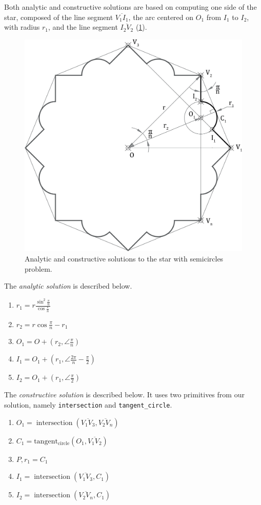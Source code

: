 Both analytic and constructive solutions are based on computing one side of the
star, composed of the line segment $\overline{V_1 I_1}$, the arc centered on
$O_1$ from $I_1$ to $I_2$, with radius $r_1$, and the line segment 
$\overline{I_2 V_2}$ (\cref{fig:eval.studies.star.sol}).

\begin{figure}[htb]
  \includegraphics[width=.7\linewidth]{fig/star-solution}
  \caption{\label{fig:eval.studies.star.sol}
    Analytic and constructive solutions to the star with semicircles problem.}%
\end{figure}

The \textit{analytic solution} is described below.

\begin{enumerate}
  \item $r_1 = r\frac{\sin^2\frac{\pi}{n}}{\cos\frac{\pi}{n}}$
  \item $r_2 = r\cos\frac{\pi}{n} - r_1$
  \item $O_1 = O + \left(r_2, \angle\frac{\pi}{n}\right)$
  \item $I_1 = O_1 + \left(r_1, \angle\frac{2\pi}{n} - \frac{\pi}{2}\right)$
  \item $I_2 = O_1 + \left(r_1, \angle\frac{\pi}{2}\right)$
\end{enumerate}

The \textit{constructive solution} is described below.  It uses two primitives
from our solution, namely \texttt{intersection} and \texttt{tangent\_circle}.

\begin{enumerate}
  \item $O_1 = \operatorname{intersection}\left(\overline{V_1 V_3},
  \overline{V_2 V_n}\right)$
  \item $C_1 = \operatorname{tangent_{circle}}\left(O_1, \overline{V_1
  V_2}\right)$
  \item $P,r_1 = C_1$
  \item $I_1 = \operatorname{intersection}\left(\overline{V_1 V_3}, C_1\right)$
  \item $I_2 = \operatorname{intersection}\left(\overline{V_2 V_n}, C_1\right)$
\end{enumerate}


